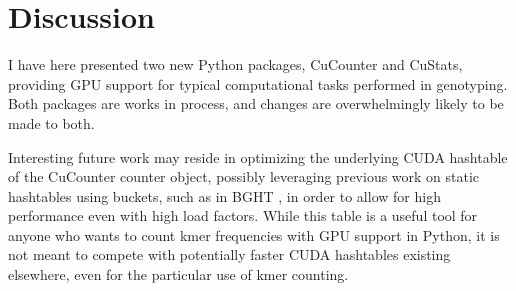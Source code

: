 \section*{Discussion}
I have here presented two new Python packages, CuCounter and CuStats, providing GPU support for typical computational tasks performed in genotyping.
Both packages are works in process, and changes are overwhelmingly likely to be made to both.

Interesting future work may reside in optimizing the underlying CUDA hashtable of the CuCounter counter object, possibly leveraging previous work on static hashtables using buckets, such as in BGHT \cite{bght}, in order to allow for high performance even with high load factors.
While this table is a useful tool for anyone who wants to count kmer frequencies with GPU support in Python, it is not meant to compete with potentially faster CUDA hashtables existing elsewhere, even for the particular use of kmer counting.
